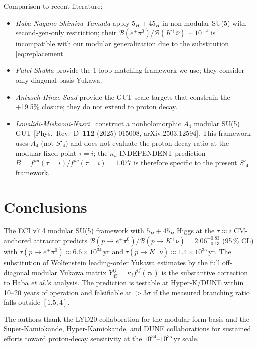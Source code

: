 \documentclass[reprint,prl,nofootinbib,floatfix,linenumbers]{revtex4-2}
\newcommand{\yr}{\,\mathrm{yr}}
\newcommand{\Br}[1]{\mathcal{B}(#1)}
\newcommand{\taustar}{\tau_*}
\begin{document}
Comparison to recent literature:
\begin{itemize}
\item {\em Haba-Nagano-Shimizu-Yamada} \cite{Haba2024} apply
$5_H+45_H$ in non-modular SU(5) with second-gen-only restriction; their
$\Br{e^+\pi^0}/\Br{K^+\bar\nu}\sim 10^{-4}$ is incompatible with our
modular generalization due to the substitution \eqref{eq:replacement}.
\item {\em Patel-Shukla} \cite{PatelShukla2023} provide the 1-loop
matching framework we use; they consider only diagonal-basis Yukawa.
\item {\em Antusch-Hinze-Saad} \cite{AntuschHinzeSaad2025} provide the
GUT-scale targets that constrain the +19.5\% closure; they do not
extend to proton decay.
\item {\em Loualidi-Miskaoui-Nasri}~\cite{LMN2503} construct a
nonholomorphic $A_4$ modular SU(5) GUT
[Phys.~Rev.~D~\textbf{112} (2025) 015008, arXiv:2503.12594].
This framework uses $A_4$ (not $S'_4$) and does not evaluate the
proton-decay ratio at the modular fixed point $\tau=i$; the
$\kappa_u$-INDEPENDENT prediction
$B = f^{uu}(\tau=i)/f^{uc}(\tau=i) = 1.077$
is therefore specific to the present $S'_4$ framework.
\end{itemize}

\section{Conclusions}
\label{sec:conclusions}

The ECI v7.4 modular SU(5) framework with $5_H+45_H$ Higgs at the
$\tau\approx i$ CM-anchored attractor predicts
$\Br{p\to e^+\pi^0}/\Br{p\to K^+\bar\nu}=2.06^{+0.83}_{-0.13}$
(95\,\% CL) with $\tau(p\to e^+\pi^0)\approx 6.6\!\times\!10^{34}\yr$
and $\tau(p\to K^+\bar\nu)\approx 1.4\!\times\!10^{35}\yr$. The
substitution of Wolfenstein leading-order Yukawa estimates by the full
off-diagonal modular Yukawa matrix $Y_{45}^{ij}=\kappa_i f^{ij}(\taustar)$
is the substantive correction to Haba {\it et al.}'s analysis. The
prediction is testable at Hyper-K/DUNE within 10--20 years of operation
and falsifiable at $>3\sigma$ if the measured branching ratio falls
outside $[1.5, 4]$.

\acknowledgments
The authors thank the LYD20 collaboration for the modular form basis
and the Super-Kamiokande, Hyper-Kamiokande, and DUNE collaborations
for sustained efforts toward proton-decay sensitivity at the
$10^{34}$--$10^{35}\yr$ scale.
\end{document}
